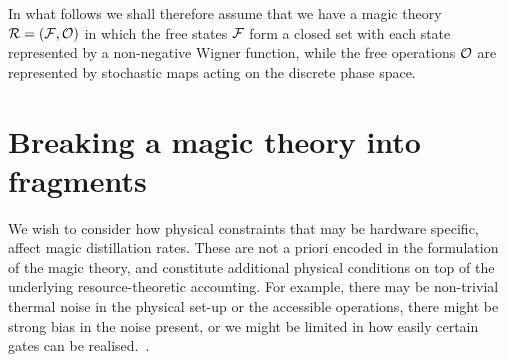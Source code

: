 \documentclass[pra,
aps,
twocolumn,
superscriptaddress,
groupedaddress,
nofootinbib,
reprint
]{revtex4-1}
\begin{document}
In what follows we shall therefore assume that we have a magic theory $\mathcal{R} = (\mathcal{F}, \mathcal{O})$ in which the free states $\mathcal{F}$ form a closed set with each state represented by a non-negative Wigner function, while the free operations $\mathcal{O}$ are represented by stochastic maps acting on the discrete phase space.


\section{Breaking a magic theory into fragments}
\label{sec:frag}

We wish to consider how physical constraints that may be hardware specific, affect magic distillation rates. These are not a priori encoded in the formulation of the magic theory, and constitute additional physical conditions on top of the underlying resource-theoretic accounting. For example, there may be non-trivial thermal noise in the physical set-up or the accessible operations, there might be strong bias in the noise present, or we might be limited in how easily certain gates can be realised.~\cite{Aliferis_2008, Stephens_2013, Li_2015, Babbush_2018, Tuckett_2019, Guillaud_2019, Fowler_2019}. 
\end{document}
